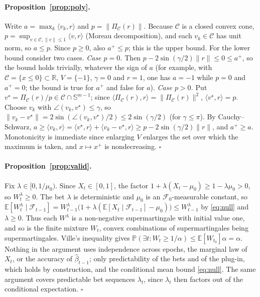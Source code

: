 \documentclass[12pt,a4paper]{article}
\newenvironment{revblock}{}{}
\newenvironment{revblock}{\begingroup\color{revcol}}{\endgroup}
\newcommand{\rtwo}[1]{#1}
\newcommand{\rtwo}[1]{{\color{revcolb}#1}}
\newcommand{\R}{\mathbb{R}}
\newcommand{\E}{\mathbb{E}}
\newcommand{\Prob}{\mathbb{P}}
\newcommand{\F}{\mathcal{F}}
\newcommand{\Cone}{\mathcal{C}}
\begin{document}
\begin{revblock}
\paragraph{Proposition~\ref{prop:poly}.}
\rtwo{Write $a=\max_k\langle v_k,r\rangle$ and $p=\|\Pi_\Cone(r)\|$.} \rtwo{Because $\Cone$ is a closed convex cone, $p=\sup_{v\in\Cone,\|v\|\le1}\langle v,r\rangle$ (Moreau decomposition), and each $v_k\in\Cone$ has unit norm, so $a\le p$.} \rtwo{Since $p\ge0$, also $a^+\le p$; this is the upper bound.} \rtwo{For the lower bound consider two cases.} \rtwo{\emph{Case $p=0$.} Then $p-2\sin(\gamma/2)\|r\|\le0\le a^+$, so the bound holds trivially, whatever the sign of $a$ (for example, with $\Cone=\{x\le0\}\subset\R$, $V=\{-1\}$, $\gamma=0$ and $r=1$, one has $a=-1$ while $p=0$ and $a^+=0$; the bound is true for $a^+$ and false for $a$).} \rtwo{\emph{Case $p>0$.} Put $v^\star=\Pi_\Cone(r)/p\in\Cone\cap\mathbb{S}^{m-1}$; since $\langle\Pi_\Cone(r),r\rangle=\|\Pi_\Cone(r)\|^2$, $\langle v^\star,r\rangle=p$.} \rtwo{Choose $v_k$ with $\angle(v_k,v^\star)\le\gamma$, so $\|v_k-v^\star\|=2\sin(\angle(v_k,v^\star)/2)\le2\sin(\gamma/2)$ (for $\gamma\le\pi$).} \rtwo{By Cauchy--Schwarz, $a\ge\langle v_k,r\rangle=\langle v^\star,r\rangle+\langle v_k-v^\star,r\rangle\ge p-2\sin(\gamma/2)\|r\|$, and $a^+\ge a$.} \rtwo{Monotonicity is immediate since enlarging $V$ enlarges the set over which the maximum is taken, and $x\mapsto x^+$ is nondecreasing.} \rtwo{\hfill$\square$}
\end{revblock}

\paragraph{Proposition~\ref{prop:valid}.}
Fix $\lambda\in[0,1/\mu_0)$. Since $X_t\in[0,1]$, the factor $1+\lambda(X_t-\mu_0)\ge1-\lambda\mu_0>0$, so $W^\lambda_t\ge0$. The bet $\lambda$ is deterministic and $\mu_0$ is an $\F_0$-measurable constant, so
$\E[W^\lambda_t\mid\F_{t-1}]=W^\lambda_{t-1}\big(1+\lambda(\E[X_t\mid\F_{t-1}]-\mu_0)\big)\le W^\lambda_{t-1}$
by \eqref{eq:null} and $\lambda\ge0$. Thus each $W^\lambda$ is a non-negative supermartingale with initial value one, and so is the finite mixture $W_t$, convex combinations of supermartingales being supermartingales. Ville's inequality gives $\Prob(\exists t: W_t\ge1/\alpha)\le\E[W_{t_0}]\alpha=\alpha$. Nothing in the argument uses independence across epochs, the marginal law of $X_t$, or the accuracy of $\hat\beta_{t-1}$; only predictability of the bets and of the plug-in, which holds by construction, and the conditional mean bound \eqref{eq:null}. The same argument covers predictable bet sequences $\lambda_t$, since $\lambda_t$ then factors out of the conditional expectation. \hfill$\square$
\end{document}

